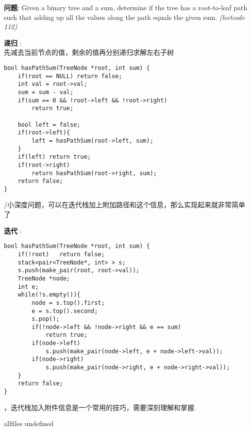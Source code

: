 \documentclass{article}
\begin{document}
\begin{CJK}{UTF8}{gbsn}     %

\else
	
\begin{description}
	\item{\textbf{问题}}: Given a binary tree and a sum, determine if the tree has a root-to-leaf path such that adding up all the values along the path equals the given sum. \textit{(leetcode 112)}
	\item{\textbf{递归}} : 
	\\先减去当前节点的值，剩余的值再分别递归求解左右子树
	\begin{lstlisting}
bool hasPathSum(TreeNode *root, int sum) {
	if(root == NULL) return false;
	int val = root->val;
	sum = sum - val;
	if(sum == 0 && !root->left && !root->right)
		return true;

	bool left = false; 
	if(root->left){
		left = hasPathSum(root->left, sum);	
	}
	if(left) return true;
	if(root->right)
		return hasPathSum(root->right, sum);
	return false;
}
	\end{lstlisting}
	/小深度问题，可以在迭代栈加上附加路径和这个信息，那么实现起来就非常简单了
	\item{\textbf{迭代}} : 
	\begin{lstlisting}
bool hasPathSum(TreeNode *root, int sum) {
	if(!root)	return false;
	stack<pair<TreeNode*, int> > s;
	s.push(make_pair(root, root->val));
	TreeNode *node;
	int e;
	while(!s.empty()){
		node = s.top().first;
		e = s.top().second;
		s.pop();
		if(!node->left && !node->right && e == sum)
			return true;
		if(node->left)
			s.push(make_pair(node->left, e + node->left->val));
		if(node->right)
			s.push(make_pair(node->right, e + node->right->val));
	}
	return false;
}
	\end{lstlisting}
	，迭代栈加入附件信息是一个常用的技巧，需要深刻理解和掌握.
\end{description}

\fi

\ifx allfiles undefined
\end{CJK}
\end{document}
